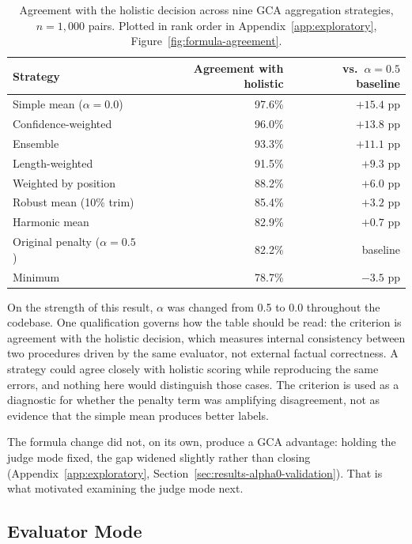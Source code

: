 \begin{table}[htbp]
\centering
\caption[Agreement with the holistic decision across nine aggregation strategies]{Agreement with the holistic decision across nine GCA aggregation
strategies, $n=1{,}000$ pairs. Plotted in rank order in
Appendix~\ref{app:exploratory}, Figure~\ref{fig:formula-agreement}.}
\label{tab:formula-comparison}
\begin{tabular}{lrr}
\toprule
Strategy & Agreement with holistic & vs.\ $\alpha=0.5$ baseline \\
\midrule
Simple mean ($\alpha=0.0$)   & 97.6\% & $+15.4$ pp \\
Confidence-weighted          & 96.0\% & $+13.8$ pp \\
Ensemble                     & 93.3\% & $+11.1$ pp \\
Length-weighted              & 91.5\% & $+9.3$ pp \\
Weighted by position         & 88.2\% & $+6.0$ pp \\
Robust mean (10\% trim)      & 85.4\% & $+3.2$ pp \\
Harmonic mean                & 82.9\% & $+0.7$ pp \\
Original penalty ($\alpha=0.5$) & 82.2\% & baseline \\
Minimum                      & 78.7\% & $-3.5$ pp \\
\bottomrule
\end{tabular}
\end{table}

On the strength of this result, $\alpha$ was changed from 0.5 to 0.0
throughout the codebase. One qualification governs how the table should be read:
the criterion is agreement with the holistic decision, which measures internal
consistency between two procedures driven by the same evaluator, not external
factual correctness. A strategy could agree closely with holistic scoring while
reproducing the same errors, and nothing here would distinguish those cases. The
criterion is used as a diagnostic for whether the penalty term was amplifying
disagreement, not as evidence that the simple mean produces better labels.

The formula change did not, on its own, produce a GCA advantage: holding the
judge mode fixed, the gap widened slightly rather than closing
(Appendix~\ref{app:exploratory}, Section~\ref{sec:results-alpha0-validation}).
That is what motivated examining the judge mode next.

\subsection{Evaluator Mode}
\label{sec:results-mode-sweep}


